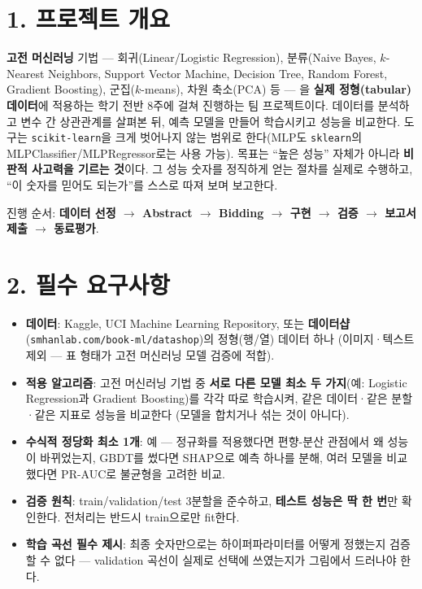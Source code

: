 \documentclass[12pt]{article}
\begin{document}

\section*{1. 프로젝트 개요}
\textbf{고전 머신러닝} 기법 --- 회귀(Linear/Logistic Regression),
분류(Naive Bayes, $k$-Nearest Neighbors, Support Vector Machine,
Decision Tree, Random Forest, Gradient Boosting), 군집($k$-means),
차원 축소(PCA) 등 --- 을 \textbf{실제 정형(tabular) 데이터}에 적용하는
학기 전반 8주에 걸쳐 진행하는 팀 프로젝트이다. 데이터를 분석하고
변수 간 상관관계를 살펴본 뒤, 예측 모델을 만들어 학습시키고 성능을
비교한다. 도구는 \texttt{scikit-learn}을 크게 벗어나지 않는 범위로
한다(MLP도 \texttt{sklearn}의 MLPClassifier/MLPRegressor로는 사용 가능).
목표는 ``높은 성능'' 자체가 아니라 \textbf{비판적 사고력을
기르는 것}이다. 그 성능 숫자를 정직하게 얻는 절차를 실제로 수행하고,
``이 숫자를 믿어도 되는가''를 스스로 따져 보며 보고한다.

\vspace{4pt}
\noindent 진행 순서: \textbf{데이터 선정 $\to$ Abstract $\to$ Bidding $\to$ 구현 $\to$
검증 $\to$ 보고서 제출 $\to$ 동료평가}.

\section*{2. 필수 요구사항}
\begin{itemize}
\item \textbf{데이터}: Kaggle, UCI Machine Learning Repository, 또는
  \textbf{데이터샵}(\texttt{smhanlab.com/book-ml/datashop})의
  정형(행/열) 데이터 하나 (이미지·텍스트 제외 --- 표 형태가
  고전 머신러닝 모델 검증에 적합).
\item \textbf{적용 알고리즘}: 고전 머신러닝 기법 중 \textbf{서로 다른 모델
  최소 두 가지}(예: Logistic Regression과 Gradient Boosting)를 각각 따로 학습시켜, 같은
  데이터·같은 분할·같은 지표로 성능을 비교한다 (모델을 합치거나 섞는 것이
  아니다).
\item \textbf{수식적 정당화 최소 1개}: 예 --- 정규화를 적용했다면
  편향-분산 관점에서 왜 성능이 바뀌었는지, GBDT를 썼다면 SHAP으로
  예측 하나를 분해, 여러 모델을 비교했다면 PR-AUC로 불균형을 고려한
  비교.
\item \textbf{검증 원칙}: train/validation/test 3분할을 준수하고,
  \textbf{테스트 성능은 딱 한 번}만 확인한다. 전처리는 반드시
  train으로만 fit한다.
\item \textbf{학습 곡선 필수 제시}: 최종 숫자만으로는 하이퍼파라미터를
  어떻게 정했는지 검증할 수 없다 --- validation 곡선이 실제로
  선택에 쓰였는지가 그림에서 드러나야 한다.
\end{itemize}
\end{document}
